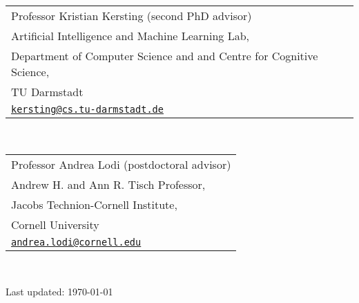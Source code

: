 \documentclass[11pt, a4paper, DIV=14, headings=small]{scrartcl}
\begin{document}
	\begin{tabular}{l}
		Professor Kristian Kersting (second PhD advisor)                                \\
		Artificial Intelligence and Machine Learning Lab,                               \\
		Department of Computer Science and and Centre for Cognitive Science,            \\
		TU Darmstadt                                                                    \\
		\href{mailto:kersting@cs.tu-darmstadt.de}{\texttt{kersting@cs.tu-darmstadt.de}} \\
	\end{tabular}\\[0.5em]
	
	\begin{tabular}{l}
		Professor Andrea Lodi (postdoctoral advisor)                            \\
		Andrew H. and Ann R. Tisch Professor,                                   \\
		Jacobs Technion-Cornell Institute,                                      \\
		Cornell University                                                      \\
		\href{mailto:andrea.lodi@cornell.edu}{\texttt{andrea.lodi@cornell.edu}} \\
	\end{tabular}\\[0.5em]
		
	\vfill{}
	\begin{center}
		{\scriptsize Last updated: \today}
	\end{center}	
\end{document}
